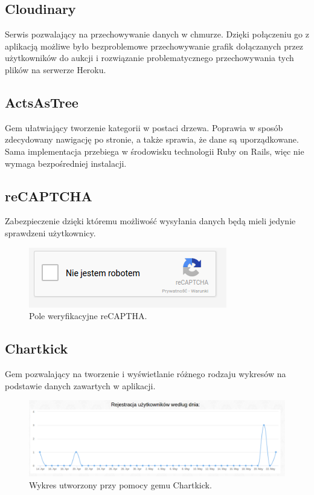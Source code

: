 \documentclass[brudnopis]{xmgr}
\begin{document}
\subsection{Cloudinary}

Serwis pozwalający na przechowywanie danych w chmurze. Dzięki połączeniu go z aplikacją możliwe było bezproblemowe przechowywanie grafik dołączanych przez użytkowników do aukcji i rozwiązanie problematycznego przechowywania tych plików na serwerze Heroku.

\subsection{ActsAsTree}

Gem ułatwiający tworzenie kategorii w postaci drzewa. Poprawia w sposób zdecydowany nawigację
po stronie, a także sprawia, że dane są uporządkowane. Sama implementacja przebiega w środowisku
technologii Ruby on Rails, więc nie wymaga bezpośredniej instalacji.

\subsection{reCAPTCHA}

Zabezpieczenie dzięki któremu możliwość wysyłania danych będą mieli jedynie sprawdzeni użytkownicy.

\begin{figure}[!tbh]
\centering
\includegraphics[scale=0.8]{fig/captcha}
\caption{Pole weryfikacyjne reCAPTHA.}
\end{figure}


\subsection{Chartkick}

Gem pozwalający na tworzenie i wyświetlanie różnego rodzaju wykresów na podstawie danych zawartych w aplikacji.

\begin{figure}[!tbh]
\centering
\includegraphics[width=\linewidth]{fig/chart}
\caption{Wykres utworzony przy pomocy gemu Chartkick.}
\end{figure}
\end{document}
